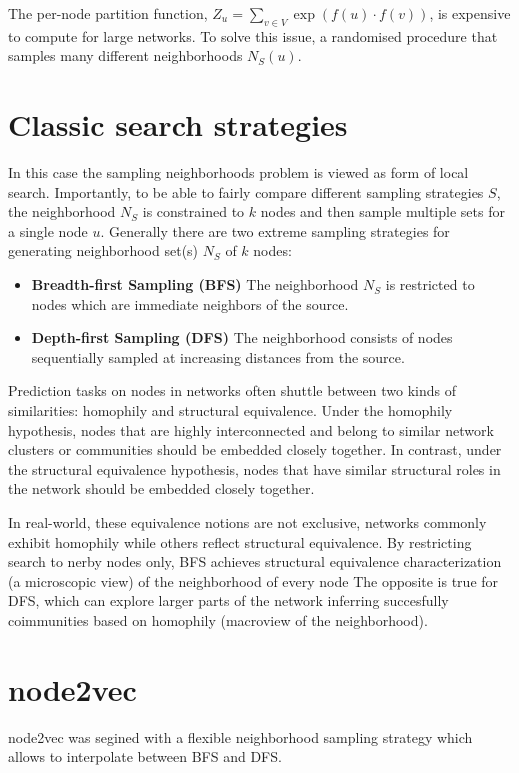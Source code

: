 \documentclass{article}
\begin{document}
The per-node partition function, $Z_u = \sum_{v \in V} \exp (f(u) \cdot f(v))$,
is expensive to compute for large networks. To solve this issue, a randomised
procedure that samples many different neighborhoods $N_S(u)$.


\section{Classic search strategies}
In this case the sampling neighborhoods problem is viewed as form of local search.
Importantly, to be able to fairly compare different sampling strategies $S$,
the neighborhood $N_S$ is constrained to $k$ nodes and then sample multiple
sets for a single node $u$. Generally there are two extreme sampling strategies
for generating neighborhood set(s) $N_S$ of $k$ nodes:
\begin{itemize}
  \item \textbf{Breadth-first Sampling (BFS)} The neighborhood $N_S$ is
    restricted to nodes which are immediate neighbors of the source.
  \item \textbf{Depth-first Sampling (DFS)} The neighborhood consists of nodes sequentially
    sampled at increasing distances from the source.
\end{itemize}

Prediction tasks on nodes in networks often shuttle between two kinds of
similarities: homophily and structural equivalence. Under the homophily
hypothesis, nodes that are highly interconnected and belong to similar network
clusters or communities should be embedded closely together. In contrast, under
the structural equivalence hypothesis, nodes that have similar structural roles
in the network should be embedded closely together.

In real-world, these equivalence notions are not exclusive, networks commonly
exhibit homophily while others reflect structural equivalence.
By restricting search to nerby nodes only, BFS achieves structural equivalence
characterization (a microscopic view) of the neighborhood of every node
The opposite is true for DFS, which can explore larger parts of the network
inferring succesfully coimmunities based on homophily (macroview of the
neighborhood).

\section{node2vec}
node2vec was segined with a flexible neighborhood sampling strategy which
allows to interpolate between BFS and DFS. 
\end{document}
